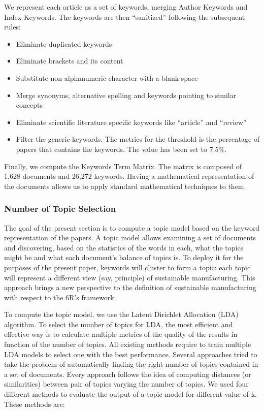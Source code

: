 \documentclass[]{book}
\providecommand{\tightlist}{%
  \setlength{\itemsep}{0pt}\setlength{\parskip}{0pt}}
\theoremstyle{definition}
\theoremstyle{definition}
\theoremstyle{definition}
\theoremstyle{remark}
\begin{document}
We represent each article as a set of keywords, merging Author Keywords
and Index Keywords. The keywords are then ``sanitized'' following the
subsequent rules:

\begin{itemize}
\tightlist
\item
  Eliminate duplicated keywords
\item
  Eliminate brackets and its content
\item
  Substitute non-alphanumeric character with a blank space
\item
  Merge synonyms, alternative spelling and keywords pointing to similar
  concepts
\item
  Eliminate scientific literature specific keywords like ``article'' and
  ``review''
\item
  Filter the generic keywords. The metrics for the threshold is the
  percentage of papers that contains the keywords. The value has been
  set to 7.5\%.
\end{itemize}

Finally, we compute the Keywords Term Matrix. The matrix is composed of
1,628 documents and 26,272 keywords. Having a mathematical
representation of the documents allows us to apply standard mathematical
techniques to them.

\subsubsection*{Number of Topic
Selection}\label{number-of-topic-selection}

The goal of the present section is to compute a topic model based on the
keyword representation of the papers. A topic model allows examining a
set of documents and discovering, based on the statistics of the words
in each, what the topics might be and what each document's balance of
topics is. To deploy it for the purposes of the present paper, keywords
will cluster to form a topic: each topic will represent a different view
(say, principle) of sustainable manufacturing. This approach brings a
new perspective to the definition of sustainable manufacturing with
respect to the 6R's framework.

To compute the topic model, we use the Latent Dirichlet Allocation (LDA)
algorithm. To select the number of topics for LDA, the most efficient
and effective way is to calculate multiple metrics of the quality of the
results in function of the number of topics. All existing methods
require to train multiple LDA models to select one with the best
performance. Several approaches tried to take the problem of
automatically finding the right number of topics contained in a set of
documents. Every approach follows the idea of computing distances (or
similarities) between pair of topics varying the number of topics. We
used four different methods to evaluate the output of a topic model for
different value of k. These methods are:
\end{document}
